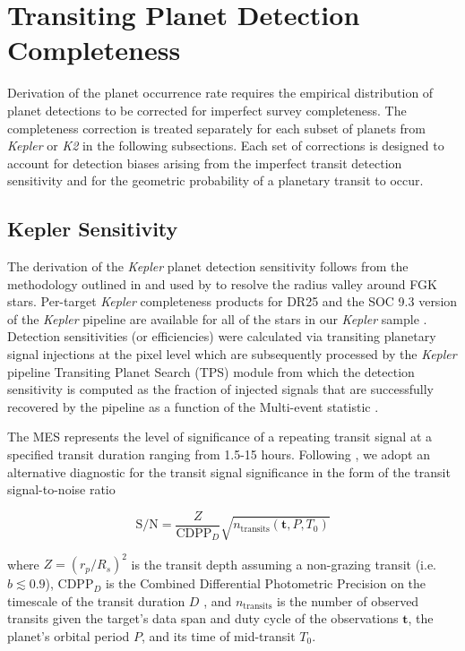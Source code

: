 \documentclass[twocolumn]{emulateapj}
\newcommand{\kepler}[1]{\emph{Kepler}#1}
\newcommand{\ktwo}[1]{\emph{K2}#1}
\begin{document}
\section{Transiting Planet Detection Completeness}  \label{sect:completeness}
Derivation of the planet occurrence rate requires the empirical distribution of planet detections to be corrected
for imperfect survey completeness. The completeness correction is treated separately for each subset
of planets from \kepler{} or \ktwo{} in the following subsections. Each set of corrections is designed to account
for detection biases arising from the imperfect transit detection sensitivity and for the 
geometric probability of a planetary transit to occur.

\subsection{Kepler Sensitivity} \label{sect:kepsens}
The derivation of the \kepler{} planet detection sensitivity follows from the methodology outlined in
\cite{christiansen16} and used by \cite{fulton17} to resolve the radius valley around FGK stars. Per-target
\kepler{} completeness products for DR25 and the SOC 9.3 version of the \kepler{} pipeline
\citep{jenkins10} are available
for all of the stars in our \kepler{} sample \citep{burke15,burke17}. Detection sensitivities
(or efficiencies) were calculated via transiting planetary signal injections at the pixel level
which are subsequently processed by the \kepler{} pipeline Transiting Planet Search (TPS) module from
which the detection sensitivity is computed as the fraction of
injected signals that are successfully recovered by the pipeline as a function of the Multi-event statistic
\citep[MES;][]{christiansen15,christiansen17}.

The MES represents the level of significance of a repeating transit signal at a specified transit duration ranging
from 1.5-15 hours. Following \cite{petigura18}, we adopt an alternative diagnostic for the transit signal significance
in the form of the transit signal-to-noise ratio

\begin{equation}
  \text{S/N} = \frac{Z}{\text{CDPP}_D} \sqrt{n_{\text{transits}}(\mathbf{t},P,T_0)}  \label{eq:snr}
\end{equation}

\noindent where $Z=(r_p/R_s)^2$ is the transit depth assuming a non-grazing transit (i.e. $b\lesssim 0.9$),
CDPP$_D$ is the Combined Differential Photometric
Precision on the timescale of the transit duration $D$ \citep{koch10}, and $n_{\text{transits}}$ is the number of
observed transits given the target's data span and duty cycle
of the observations $\textbf{t}$, the planet's orbital period $P$, and its time of mid-transit $T_0$.
\end{document}
